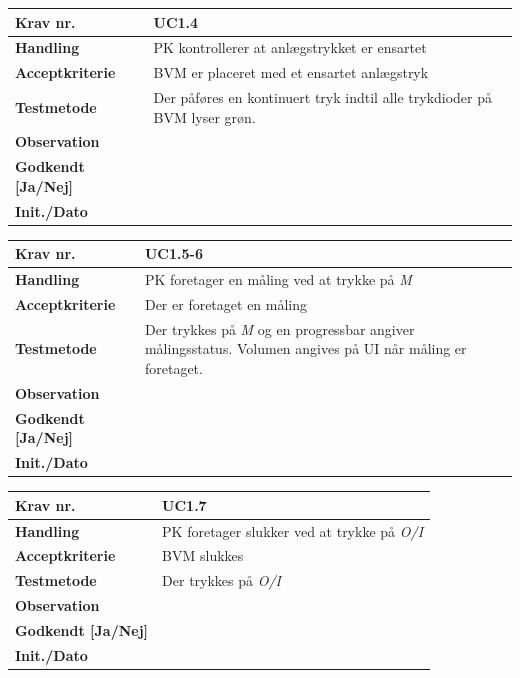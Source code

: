\begin{tabularx}{1\textwidth}{|l|X|}
\hline
\textbf{Krav nr.}              & UC1.4  \\ \hline
\textbf{Handling}				& PK kontrollerer at anlægstrykket er ensartet \\ \hline
\textbf{Acceptkriterie}        & BVM er placeret med et ensartet anlægstryk \\ \hline
\textbf{Testmetode}            & Der påføres en kontinuert tryk indtil alle trykdioder på BVM lyser grøn.  \\ \hline
\textbf{Observation}           &  \\ \hline
\textbf{Godkendt {[}Ja/Nej{]}} &  \\ \hline
\textbf{Init./Dato}            &  \\ \hline
\end{tabularx}
		
			

\begin{tabularx}{1\textwidth}{|l|X|}
\hline
\textbf{Krav nr.}              & UC1.5-6  \\ \hline
\textbf{Handling}				& PK foretager en måling ved at trykke på \textit{M}\\ \hline
\textbf{Acceptkriterie}        & Der er foretaget en måling\\ \hline
\textbf{Testmetode}            & Der trykkes på \textit{M} og en progressbar angiver målingsstatus. Volumen angives på UI når måling er foretaget. \\ \hline
\textbf{Observation}           &  \\ \hline
\textbf{Godkendt {[}Ja/Nej{]}} &  \\ \hline
\textbf{Init./Dato}            &  \\ \hline
\end{tabularx}


\begin{tabularx}{1\textwidth}{|l|X|}
\hline
\textbf{Krav nr.}              & UC1.7  \\ \hline
\textbf{Handling}				& PK foretager slukker ved at trykke på \textit{O/I}\\ \hline
\textbf{Acceptkriterie}        & BVM slukkes\\ \hline
\textbf{Testmetode}            & Der trykkes på \textit{O/I} \\ \hline
\textbf{Observation}           &  \\ \hline
\textbf{Godkendt {[}Ja/Nej{]}} &  \\ \hline
\textbf{Init./Dato}            &  \\ \hline
\end{tabularx}
	
